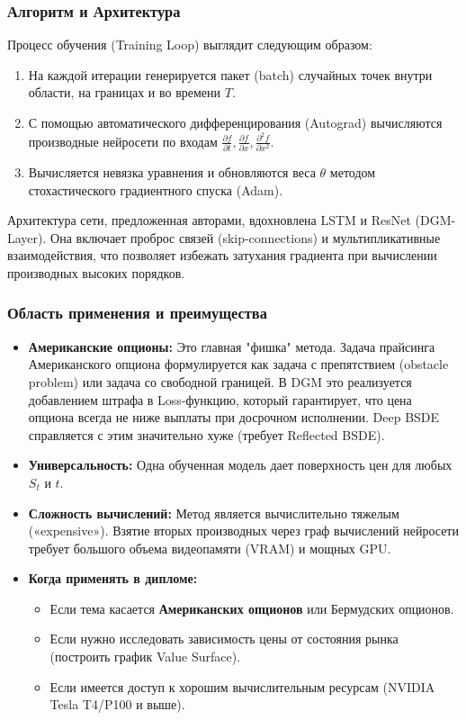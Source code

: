 \subsubsection{Алгоритм и Архитектура}
Процесс обучения (Training Loop) выглядит следующим образом:
\begin{enumerate}
    \item На каждой итерации генерируется пакет (batch) случайных точек внутри области, на границах и во времени $T$.
    \item С помощью автоматического дифференцирования (Autograd) вычисляются производные нейросети по входам $\frac{\partial f}{\partial t}, \frac{\partial f}{\partial x}, \frac{\partial^2 f}{\partial x^2}$.
    \item Вычисляется невязка уравнения и обновляются веса $\theta$ методом стохастического градиентного спуска (Adam).
\end{enumerate}

Архитектура сети, предложенная авторами, вдохновлена LSTM и ResNet (DGM-Layer). Она включает проброс связей (skip-connections) и мультипликативные взаимодействия, что позволяет избежать затухания градиента при вычислении производных высоких порядков.

\subsubsection{Область применения и преимущества}
\begin{itemize}
    \item \textbf{Американские опционы:} Это главная "фишка" метода. Задача прайсинга Американского опциона формулируется как задача с препятствием (obstacle problem) или задача со свободной границей. В DGM это реализуется добавлением штрафа в Loss-функцию, который гарантирует, что цена опциона всегда не ниже выплаты при досрочном исполнении. Deep BSDE справляется с этим значительно хуже (требует Reflected BSDE).
    \item \textbf{Универсальность:} Одна обученная модель дает поверхность цен для любых $S_t$ и $t$.
    \item \textbf{Сложность вычислений:} Метод является вычислительно тяжелым («expensive»). Взятие вторых производных через граф вычислений нейросети требует большого объема видеопамяти (VRAM) и мощных GPU.
    \item \textbf{Когда применять в дипломе:}
    \begin{itemize}
        \item Если тема касается \textbf{Американских опционов} или Бермудских опционов.
        \item Если нужно исследовать зависимость цены от состояния рынка (построить график Value Surface).
        \item Если имеется доступ к хорошим вычислительным ресурсам (NVIDIA Tesla T4/P100 и выше).
    \end{itemize}
\end{itemize}

